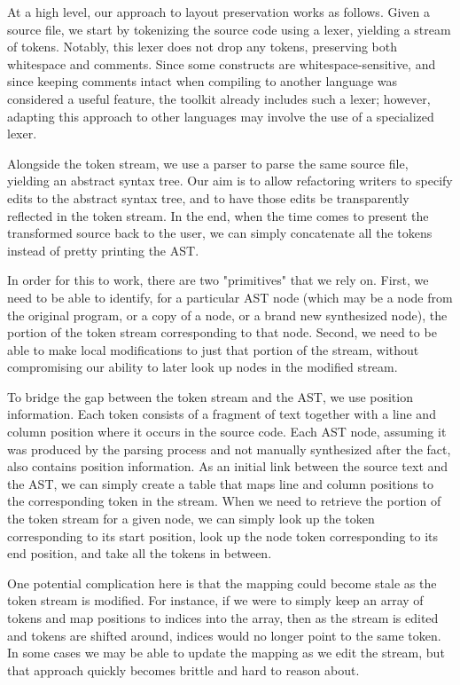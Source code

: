 At a high level, our approach to layout preservation works as follows. Given a
\matlab source file, we start by tokenizing the source code using a \matlab
lexer, yielding a stream of tokens. Notably, this lexer does not drop any
tokens, preserving both whitespace and comments. Since some \matlab constructs
are whitespace-sensitive, and since keeping comments intact when compiling
\matlab to another language was considered a useful feature, the \mclab toolkit
already includes such a lexer; however, adapting this approach to other
languages may involve the use of a specialized lexer.

Alongside the token stream, we use a \matlab parser to parse the same source
file, yielding an abstract syntax tree. Our aim is to allow refactoring
writers to specify edits to the abstract syntax tree, and to have those edits
be transparently reflected in the token stream. In the end, when the time
comes to present the transformed source back to the user, we can simply
concatenate all the tokens instead of pretty printing the AST.

In order for this to work, there are two "primitives" that we rely on. First,
we need to be able to identify, for a particular AST node (which may be a node
from the original program, or a copy of a node, or a brand new synthesized
node), the portion of the token stream corresponding to that node. Second, we
need to be able to make local modifications to just that portion of the stream,
without compromising our ability to later look up nodes in the modified stream.

To bridge the gap between the token stream and the AST, we use position
information. Each token consists of a fragment of text together with a line and
column position where it occurs in the source code. Each AST node, assuming it
was produced by the parsing process and not manually synthesized after the
fact, also contains position information. As an initial link between the source
text and the AST, we can simply create a table that maps line and column
positions to the corresponding token in the stream. When we need to retrieve
the portion of the token stream for a given node, we can simply look up the
token corresponding to its start position, look up the node token corresponding
to its end position, and take all the tokens in between.

One potential complication here is that the mapping could become stale as the
token stream is modified. For instance, if we were to simply keep an array of
tokens and map positions to indices into the array, then as the stream is
edited and tokens are shifted around, indices would no longer point to the same
token. In some cases we may be able to update the mapping as we edit the
stream, but that approach quickly becomes brittle and hard to reason about.

